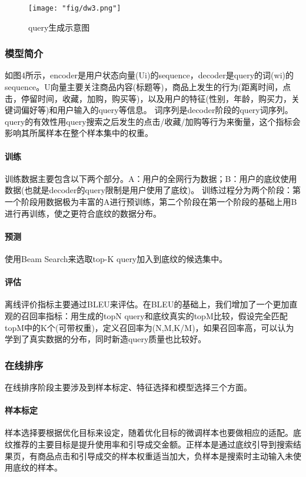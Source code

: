 \begin{figure}[!h]
	\centering
	\texttt{[image: "fig/dw3.png"]}
	\caption{query生成示意图}
	\label{fig:dw3}
\end{figure}

\subsubsection{模型简介}
如图4所示，encoder是用户状态向量(Ui)的sequence，decoder是query的词(wi)的sequence。U向量主要关注商品内容(标题等)，商品上发生的行为(距离时间，点击，停留时间，收藏，加购，购买等)，以及用户的特征(性别，年龄，购买力，关键词偏好等)和用户输入的query等信息。
词序列是decoder阶段的query词序列。query的有效性用query搜索之后发生的点击/收藏/加购等行为来衡量，这个指标会影响其所属样本在整个样本集中的权重。
\paragraph{训练}
训练数据主要包含以下两个部分。A：用户的全网行为数据；B：用户的底纹使用数据(也就是decoder的query限制是用户使用了底纹)。
训练过程分为两个阶段：第一个阶段用数据极为丰富的A进行预训练，第二个阶段在第一个阶段的基础上用B进行再训练，使之更符合底纹的数据分布。
\paragraph{预测}
使用Beam Search来选取top-K query加入到底纹的候选集中。
\paragraph{评估}
离线评价指标主要通过BLEU来评估。在BLEU的基础上，我们增加了一个更加直观的召回率指标：用生成的topN query和底纹真实的topM比较，假设完全匹配topM中的K个(可带权重)，定义召回率为(N,M,K/M)，如果召回率高，可以认为学到了真实数据的分布，同时新造query质量也比较好。

\subsubsection{在线排序}
在线排序阶段主要涉及到样本标定、特征选择和模型选择三个方面。
\paragraph{样本标定}
样本选择要根据优化目标来设定，随着优化目标的微调样本也要做相应的适配。底纹推荐的主要目标是提升使用率和引导成交金额。正样本是通过底纹引导到搜索结果页，有商品点击和引导成交的样本权重适当加大，负样本是搜索时主动输入未使用底纹的样本。
